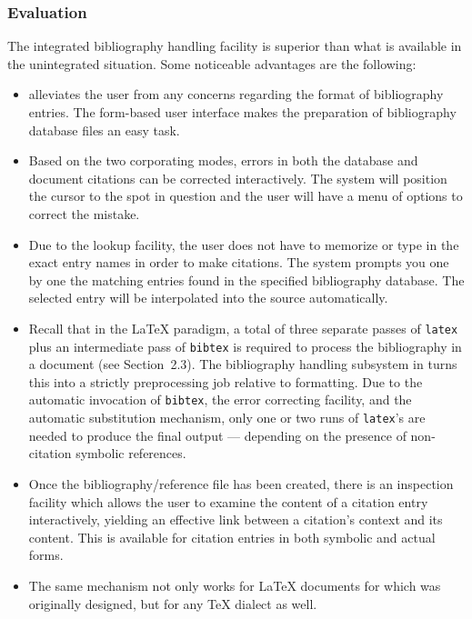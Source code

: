 \subsubsection{Evaluation}
The integrated bibliography handling facility is superior than
what is available in the unintegrated situation.
Some noticeable advantages are the following:
\begin{itemize}
  \item {\BM} alleviates the user from any concerns regarding the format of
	bibliography entries.  The form-based user interface makes the
	preparation of bibliography database files an easy task.
  \item Based on the two corporating modes, errors in both the database
	and document citations can be corrected interactively.
	The system will position the cursor to the spot in question and
	the user will have a menu of options to correct the mistake.
  \item Due to the lookup facility,
        the user does not have to memorize or type in the exact entry names 
        in order to make citations.  The system prompts you one by
	one the matching entries found in the specified bibliography
	database.  The selected entry will be interpolated into the source
        automatically.
  \item Recall that in the {\LaTeX} paradigm, a total of three separate passes
	of \verb|latex| plus an intermediate pass of \verb|bibtex| is required
	to process the bibliography in a document (see Section~2.3).
	The bibliography handling subsystem in {\TM} turns this into a strictly
	preprocessing job relative to formatting.
	Due to the automatic invocation of \verb|bibtex|,
	the error correcting facility, and the automatic substitution mechanism,
	only one or two runs of \verb|latex|'s are needed to produce the final output
        --- depending on the presence of non-citation symbolic references.
  \item Once the bibliography/reference file has been created,
	there is an inspection facility which allows the user to examine
	the content of a citation entry interactively, yielding an effective
	link between a citation's context and its content.
	This is available for citation entries in both symbolic and actual
	forms.
  \item The same mechanism not only works for {\LaTeX} documents
        for which {\BibTeX} was originally designed, but for any
	{\TeX} dialect as well.
\end{itemize}


